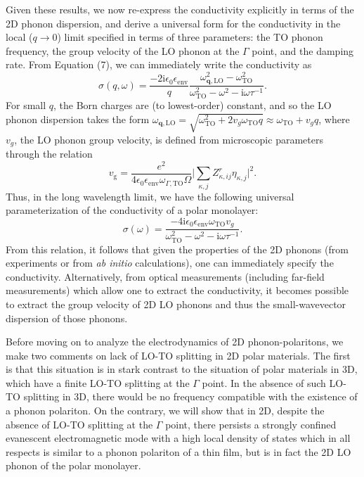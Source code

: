 \documentclass[aps,prb,twocolumn,
	           groupedaddress,superscriptaddress,
               amsfonts,amssymb,amsmath,floatfix,
	           citeautoscript]{revtex4-1}
\newcommand{\iu}{\mathrm{i}}
\begin{document}
  Given these results, we now re-express the conductivity explicitly in terms of the 2D phonon dispersion, and derive a universal form for the conductivity in the local ($q\rightarrow 0$) limit specified in terms of three parameters: the TO phonon frequency, the group velocity of the LO phonon at the $\Gamma$ point, and the damping rate. From Equation (7), we can immediately write the conductivity as
  \begin{equation}
  \sigma(q,\omega) = \frac{-2\iu\epsilon_0\epsilon_{\mathrm{env}}}{q}\frac{\omega^2_{\mathbf{q},\mathrm{LO}}-\omega^2_{\mathrm{TO}}}{\omega^2_{\mathrm{TO}}-\omega^2-\iu\omega\tau^{-1}}.
  \end{equation}
 For small $q$,  the Born charges are (to lowest-order) constant, and so the LO phonon dispersion takes the form $\omega_{\mathbf{q},\mathrm{LO}}=\sqrt{\omega^2_{\mathrm{TO}}+2v_g\omega_{\mathrm{TO}}q} \approx \omega_{\mathrm{TO}} + v_gq$, where $v_g$, the LO phonon group velocity, is defined from microscopic parameters through the relation
 \begin{equation}
    v_{\mathrm{g}} = \frac{e^2 }{4\epsilon_0 \epsilon_{\mathrm{env}}\omega_{\Gamma, \mathrm{TO}}\Omega}\Big|\sum\limits_{\kappa,j}Z^r_{\kappa,ij}\eta_{\kappa,j}  \Big|^2. 
\end{equation}
Thus, in the long wavelength limit, we have the following universal parameterization of the conductivity of a polar monolayer:
\begin{equation}
    \sigma(\omega) =  \frac{-4\iu\epsilon_0\epsilon_{\mathrm{env}}\omega_{\mathrm{TO}}v_g}{\omega^2_{\mathrm{TO}}-\omega^2-\iu\omega\tau^{-1}}.
\end{equation}
From this relation, it follows that given the properties of the 2D phonons (from experiments or from \emph{ab initio} calculations), one can immediately specify the conductivity. Alternatively, from optical measurements (including far-field measurements) which allow one to extract the conductivity, it becomes possible to extract the group velocity of 2D LO phonons and thus the small-wavevector dispersion of those phonons. 
  
Before moving on to analyze the electrodynamics of 2D phonon-polaritons, we make two comments on lack of LO-TO splitting in 2D polar materials. The first is that this situation is in stark contrast to the situation of polar materials in 3D, which have a finite LO-TO splitting at the $\Gamma$ point. In the absence of such LO-TO splitting in 3D, there would be no frequency compatible with the existence of a phonon polariton. On the contrary, we will show that in 2D, despite the absence of LO-TO splitting at the $\Gamma$ point, there persists a strongly confined evanescent electromagnetic mode with a high local density of states which in all respects is similar to a phonon polariton of a thin film, but is in fact the 2D LO phonon of the polar monolayer.
\end{document}
